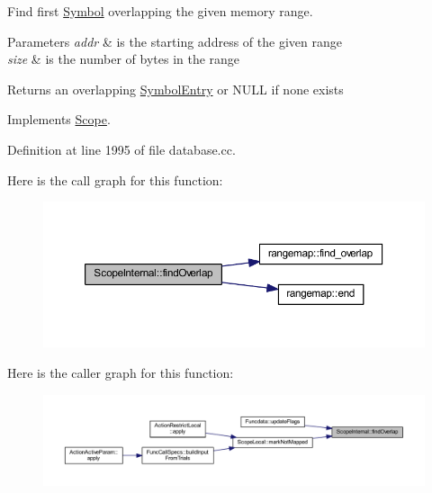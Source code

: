 Find first \mbox{\hyperlink{class_symbol}{Symbol}} overlapping the given memory range. 


\begin{DoxyParams}{Parameters}
{\em addr} & is the starting address of the given range \\
\hline
{\em size} & is the number of bytes in the range \\
\hline
\end{DoxyParams}
\begin{DoxyReturn}{Returns}
an overlapping \mbox{\hyperlink{class_symbol_entry}{Symbol\+Entry}} or N\+U\+LL if none exists 
\end{DoxyReturn}


Implements \mbox{\hyperlink{class_scope_a3395b6194a59515caa1ede92fd6ac511}{Scope}}.



Definition at line 1995 of file database.\+cc.

Here is the call graph for this function\+:
\nopagebreak
\begin{figure}[H]
\begin{center}
\leavevmode
\includegraphics[width=350pt]{class_scope_internal_a3c241113085be88a74f73d2431de72f3_cgraph}
\end{center}
\end{figure}
Here is the caller graph for this function\+:
\nopagebreak
\begin{figure}[H]
\begin{center}
\leavevmode
\includegraphics[width=350pt]{class_scope_internal_a3c241113085be88a74f73d2431de72f3_icgraph}
\end{center}
\end{figure}
\mbox{\label{class_scope_internal_a4ccbbc37afa4eee7c6cce98dbd3a5bff}} 
